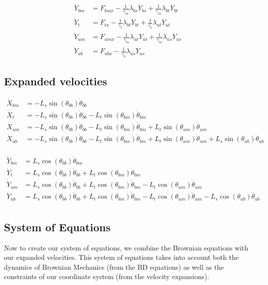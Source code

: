 \documentclass[11pt,twocolumn]{article}
\newcommand{\gb}{\frac{1}{\gamma_b}}
\newcommand{\gm}{\frac{1}{\gamma_m}}
\newcommand{\gt}{\frac{1}{\gamma_t}}
\begin{document}
\begin{align*}
  \dot{Y}_{bm} &= F_{bmx} - \gm\lambda_{bs}Y_{bs} + \gm\lambda_{bt}Y_{bt}\\
  \dot{Y}_{t}  &= F_{tx}  - \gt\lambda_{bt}Y_{bt} + \gt\lambda_{ut}Y_{ut}\\
  \dot{Y}_{um} &= F_{umx} - \gm\lambda_{ut}Y_{ut} + \gm\lambda_{us}Y_{us}\\
  \dot{Y}_{ub} &= F_{ubx} - \gb\lambda_{us}Y_{us}
\end{align*}

\subsection{Expanded velocities}

\begin{align*}
\dot{X}_{bm} &= -L_s\sin(\theta_{bb})\dot{\theta}_{bb}\\
\dot{X}_{t } &= -L_s\sin(\theta_{bb})\dot{\theta}_{bb} - L_t\sin(\theta_{bm})\dot{\theta}_{bm}\\
\dot{X}_{um} &= -L_s\sin(\theta_{bb})\dot{\theta}_{bb} - L_t\sin(\theta_{bm})\dot{\theta}_{bm} + L_t\sin(\theta_{um})\dot{\theta}_{um}\\
\dot{X}_{ub} &= -L_s\sin(\theta_{bb})\dot{\theta}_{bb} - L_t\sin(\theta_{bm})\dot{\theta}_{bm} + L_t\sin(\theta_{um})\dot{\theta}_{um} + L_s\sin(\theta_{ub})\dot{\theta}_{ub}\\
\end{align*}

\begin{align*}
\dot{Y}_{bm} &= L_s\cos(\theta_{bb})\dot{\theta}_{bm}\\
\dot{Y}_{t } &= L_s\cos(\theta_{bb})\dot{\theta}_{bb} + L_t\cos(\theta_{bm})\dot{\theta}_{bm}\\
\dot{Y}_{um} &= L_s\cos(\theta_{bb})\dot{\theta}_{bb} + L_t\cos(\theta_{bm})\dot{\theta}_{bm} - L_t\cos(\theta_{um})\dot{\theta}_{um}\\
\dot{Y}_{ub} &= L_s\cos(\theta_{bb})\dot{\theta}_{bb} + L_t\cos(\theta_{bm})\dot{\theta}_{bm} - L_t\cos(\theta_{um})\dot{\theta}_{um} - L_s\cos(\theta_{ub})\dot{\theta}_{ub}\\
\end{align*}

\subsection{System of Equations}
Now to create our system of equations, we combine the Brownian equations with our expanded velocities. This system of equations takes into account both the dynamics of Brownian Mechanics (from the BD equations) as well as the constraints of our coordinate system (from the velocity expansions).
\end{document}
